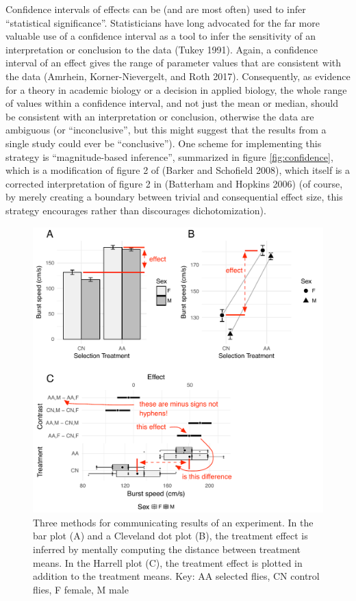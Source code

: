 \documentclass[]{article}
\theoremstyle{definition}
\theoremstyle{definition}
\theoremstyle{definition}
\theoremstyle{remark}
\begin{document}
Confidence intervals of effects can be (and are most often) used to
infer ``statistical significance''. Statisticians have long advocated
for the far more valuable use of a confidence interval as a tool to
infer the sensitivity of an interpretation or conclusion to the data
(Tukey 1991). Again, a confidence interval of an effect gives the range
of parameter values that are consistent with the data (Amrhein,
Korner-Nievergelt, and Roth 2017). Consequently, as evidence for a
theory in academic biology or a decision in applied biology, the whole
range of values within a confidence interval, and not just the mean or
median, should be consistent with an interpretation or conclusion,
otherwise the data are ambiguous (or ``inconclusive'', but this might
suggest that the results from a single study could ever be
``conclusive''). One scheme for implementing this strategy is
``magnitude-based inference'', summarized in figure
\ref{fig:confidence}, which is a modification of figure 2 of (Barker and
Schofield 2008), which itself is a corrected interpretation of figure 2
in (Batterham and Hopkins 2006) (of course, by merely creating a
boundary between trivial and consequential effect size, this strategy
encourages rather than discourages dichotomization).

\begin{figure}
\includegraphics{../figs/fig1} \caption{Three methods for communicating results of an experiment. In the bar plot (A) and a Cleveland dot plot (B), the treatment effect is inferred by mentally computing the distance between treatment means. In the Harrell plot (C), the treatment effect is plotted in addition to the treatment means. Key: AA selected flies, CN control flies, F female, M male}\label{fig:plots}
\end{figure}
\end{document}
